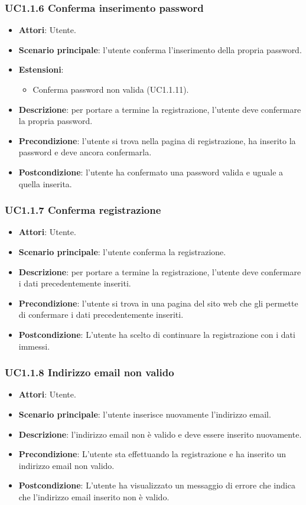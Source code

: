 \subsubsection{UC1.1.6 Conferma inserimento password}
\begin{itemize}
\item \textbf{Attori}: Utente.
\item \textbf{Scenario principale}: l'utente conferma l'inserimento della propria password.
\item \textbf{Estensioni}:
\begin{itemize}
\item Conferma password non valida (UC1.1.11).
\end{itemize}
\item \textbf{Descrizione}: per portare a termine la registrazione, l'utente deve confermare la propria password.
\item \textbf{Precondizione}: l'utente si trova nella pagina di registrazione, ha inserito la password e deve ancora confermarla.
\item \textbf{Postcondizione}: l'utente ha confermato una password valida e uguale a quella inserita.
\end{itemize}
\subsubsection{UC1.1.7 Conferma registrazione}
\begin{itemize}
\item \textbf{Attori}: Utente.
\item \textbf{Scenario principale}: l'utente conferma la registrazione.
\item \textbf{Descrizione}: per portare a termine la registrazione, l'utente deve confermare i dati precedentemente inseriti.
\item \textbf{Precondizione}: l'utente si trova in una pagina del sito web che gli permette di confermare i dati precedentemente inseriti.
\item \textbf{Postcondizione}: L'utente ha scelto di continuare la registrazione con i dati immessi.
\end{itemize}
\subsubsection{UC1.1.8 Indirizzo email non valido}
\begin{itemize}
\item \textbf{Attori}: Utente.
\item \textbf{Scenario principale}: l'utente inserisce nuovamente l'indirizzo email.
\item \textbf{Descrizione}: l'indirizzo email non è valido e deve essere inserito nuovamente.
\item \textbf{Precondizione}: L'utente sta effettuando la registrazione e ha inserito un indirizzo email non valido.
\item \textbf{Postcondizione}: L'utente ha visualizzato un messaggio di errore che indica che l'indirizzo email inserito non è valido.
\end{itemize}
